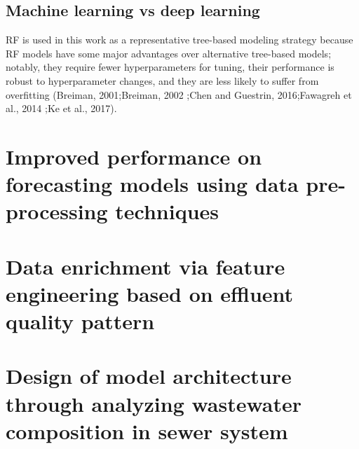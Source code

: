 \subsection{Machine learning vs deep learning}
RF is used in this work as a representative tree-based modeling strategy because RF models have some major advantages over alternative tree-based models; notably, they require fewer hyperparameters for tuning, their performance is robust to hyperparameter changes, and they are less likely to suffer from overfitting (Breiman, 2001;Breiman, 2002 ;Chen and Guestrin, 2016;Fawagreh et al., 2014 ;Ke et al., 2017).
\section{Improved performance on forecasting models using data pre-processing techniques}
\section{Data enrichment via feature engineering based on effluent quality pattern}
\section{Design of model architecture through analyzing wastewater composition in sewer system}
